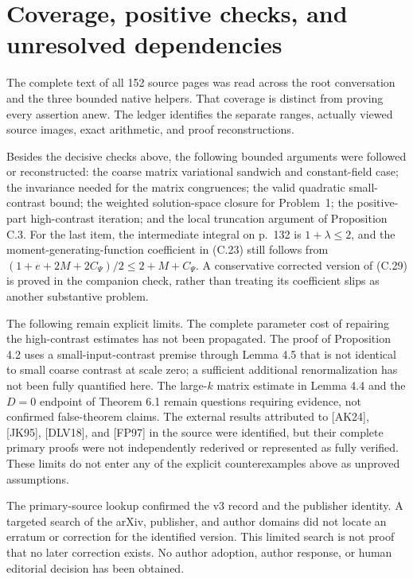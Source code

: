 \documentclass[10pt]{article}
\begin{document}
\section*{Coverage, positive checks, and unresolved dependencies}
The complete text of all 152 source pages was read across the root conversation and the three bounded native helpers. That coverage is distinct from proving every assertion anew. The ledger identifies the separate ranges, actually viewed source images, exact arithmetic, and proof reconstructions.\par
Besides the decisive checks above, the following bounded arguments were followed or reconstructed: the coarse matrix variational sandwich and constant-field case; the invariance needed for the matrix congruences; the valid quadratic small-contrast bound; the weighted solution-space closure for Problem 1; the positive-part high-contrast iteration; and the local truncation argument of Proposition C.3. For the last item, the intermediate integral on p. 132 is \(1+\lambda\le2\), and the moment-generating-function coefficient in (C.23) still follows from \((1+e+2M+2C_\Psi)/2\le2+M+C_\Psi\). A conservative corrected version of (C.29) is proved in the companion check, rather than treating its coefficient slips as another substantive problem.\par
The following remain explicit limits. The complete parameter cost of repairing the high-contrast estimates has not been propagated. The proof of Proposition 4.2 uses a small-input-contrast premise through Lemma 4.5 that is not identical to small coarse contrast at scale zero; a sufficient additional renormalization has not been fully quantified here. The large-\(k\) matrix estimate in Lemma 4.4 and the \(D=0\) endpoint of Theorem 6.1 remain questions requiring evidence, not confirmed false-theorem claims. The external results attributed to [AK24], [JK95], [DLV18], and [FP97] in the source were identified, but their complete primary proofs were not independently rederived or represented as fully verified. These limits do not enter any of the explicit counterexamples above as unproved assumptions.\par
The primary-source lookup confirmed the v3 record and the publisher identity. A targeted search of the arXiv, publisher, and author domains did not locate an erratum or correction for the identified version. This limited search is not proof that no later correction exists. No author adoption, author response, or human editorial decision has been obtained.\par
\end{document}
